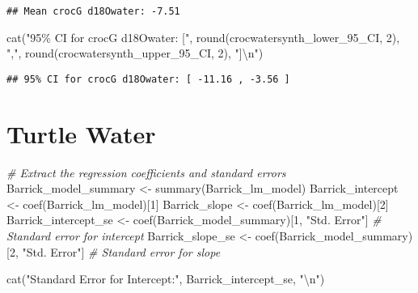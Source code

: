 \documentclass[
]{article}
\newenvironment{Shaded}{\begin{snugshade}}{\end{snugshade}}
\newcommand{\CommentTok}[1]{\textcolor[rgb]{0.56,0.35,0.01}{\textit{#1}}}
\newcommand{\DecValTok}[1]{\textcolor[rgb]{0.00,0.00,0.81}{#1}}
\newcommand{\FunctionTok}[1]{\textcolor[rgb]{0.00,0.00,0.00}{#1}}
\newcommand{\NormalTok}[1]{#1}
\newcommand{\OtherTok}[1]{\textcolor[rgb]{0.56,0.35,0.01}{#1}}
\newcommand{\SpecialCharTok}[1]{\textcolor[rgb]{0.00,0.00,0.00}{#1}}
\newcommand{\StringTok}[1]{\textcolor[rgb]{0.31,0.60,0.02}{#1}}
\begin{document}
\begin{verbatim}
## Mean crocG d18Owater: -7.51
\end{verbatim}

\begin{Shaded}
\begin{Highlighting}[]
\FunctionTok{cat}\NormalTok{(}\StringTok{"95\% CI for crocG d18Owater: ["}\NormalTok{, }\FunctionTok{round}\NormalTok{(crocwatersynth\_lower\_95\_CI, }\DecValTok{2}\NormalTok{), }\StringTok{","}\NormalTok{, }\FunctionTok{round}\NormalTok{(crocwatersynth\_upper\_95\_CI, }\DecValTok{2}\NormalTok{), }\StringTok{"]}\SpecialCharTok{\textbackslash{}n}\StringTok{"}\NormalTok{)}
\end{Highlighting}
\end{Shaded}

\begin{verbatim}
## 95% CI for crocG d18Owater: [ -11.16 , -3.56 ]
\end{verbatim}

\hypertarget{turtle-water}{%
\section{Turtle Water}\label{turtle-water}}

\begin{Shaded}
\begin{Highlighting}[]
\CommentTok{\# Extract the regression coefficients and standard errors}
\NormalTok{Barrick\_model\_summary }\OtherTok{\textless{}{-}} \FunctionTok{summary}\NormalTok{(Barrick\_lm\_model)}
\NormalTok{Barrick\_intercept }\OtherTok{\textless{}{-}} \FunctionTok{coef}\NormalTok{(Barrick\_lm\_model)[}\DecValTok{1}\NormalTok{]}
\NormalTok{Barrick\_slope }\OtherTok{\textless{}{-}} \FunctionTok{coef}\NormalTok{(Barrick\_lm\_model)[}\DecValTok{2}\NormalTok{]}
\NormalTok{Barrick\_intercept\_se }\OtherTok{\textless{}{-}} \FunctionTok{coef}\NormalTok{(Barrick\_model\_summary)[}\DecValTok{1}\NormalTok{, }\StringTok{"Std. Error"}\NormalTok{]  }\CommentTok{\# Standard error for intercept}
\NormalTok{Barrick\_slope\_se }\OtherTok{\textless{}{-}} \FunctionTok{coef}\NormalTok{(Barrick\_model\_summary)[}\DecValTok{2}\NormalTok{, }\StringTok{"Std. Error"}\NormalTok{]      }\CommentTok{\# Standard error for slope}

\FunctionTok{cat}\NormalTok{(}\StringTok{"Standard Error for Intercept:"}\NormalTok{, Barrick\_intercept\_se, }\StringTok{"}\SpecialCharTok{\textbackslash{}n}\StringTok{"}\NormalTok{)}
\end{Highlighting}
\end{Shaded}
\end{document}
